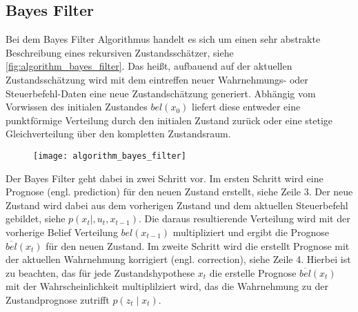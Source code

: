 \subsection{Bayes Filter}

Bei dem Bayes Filter Algorithmus handelt es sich um einen sehr abstrakte Beschreibung eines rekursiven Zustandsschätzer, siehe \autoref{fig:algorithm_bayes_filter}. Das heißt, aufbauend  auf der aktuellen Zustandsschätzung wird mit dem eintreffen neuer Wahrnehmungs- oder Steuerbefehl-Daten eine neue Zustandschätzung generiert. Abhängig vom Vorwissen des initialen Zustandes $bel(x_0)$ liefert diese entweder eine punktförmige Verteilung durch den initialen Zustand zurück oder eine stetige Gleichverteilung über den kompletten Zustandsraum. 

\begin{figure}
	\centering
	\texttt{[image: algorithm\_bayes\_filter]}
	\label{fig:algorithm_bayes_filter}
\end{figure}

Der Bayes Filter geht dabei in zwei Schritt vor. Im ersten Schritt wird eine Prognose (engl. prediction) für den neuen Zustand erstellt, siehe Zeile 3. Der neue Zustand wird dabei aus dem vorherigen Zustand und dem aktuellen Steuerbefehl gebildet, siehe $p(x_t \mid, u_t, x_{t-1})$. Die daraus resultierende Verteilung wird mit der vorherige Belief Verteilung $bel(x_{t-1})$ multipliziert und ergibt die Prognose $\overline{bel}(x_t)$ für den neuen Zustand. Im zweite Schritt wird die erstellt Prognose mit der aktuellen Wahrnehmung korrigiert (engl. correction), siehe Zeile 4. Hierbei ist zu beachten, das für jede Zustandshypothese $x_t$ die erstelle Prognose $\overline{bel}(x_t)$ mit der Wahrscheinlichkeit multiplilziert wird, das die Wahrnehmung zu der Zustandprognose zutrifft $p(z_t \mid x_t)$.


%
%
